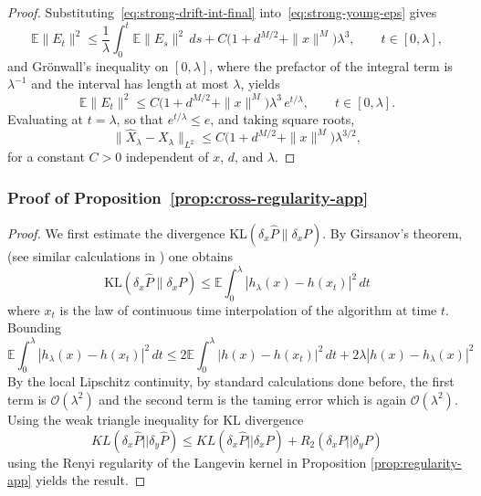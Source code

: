 \documentclass[11pt,a4paper,reqno]{amsart}
\theoremstyle{plain}
\theoremstyle{definition}
\theoremstyle{remark}
\newcommand{\E}{\mathbb{E}}
\newcommand{\KL}{\mathrm{KL}}
\begin{document}
\begin{proof}
Substituting~\eqref{eq:strong-drift-int-final} into~\eqref{eq:strong-young-eps}
gives
\[
  \E\|E_t\|^2
  \le
  \frac{1}{\lambda}\int_0^t \E\|E_s\|^2\,ds
  +
  C\bigl(1+d^{M/2}+\|x\|^{M}\bigr)\lambda^3,
  \qquad t\in[0,\lambda],
\]
and Grönwall's inequality on $[0,\lambda]$, where the prefactor of the integral
term is $\lambda^{-1}$ and the interval has length at most $\lambda$, yields
\[
  \E\|E_t\|^2
  \le
  C\bigl(1+d^{M/2}+\|x\|^{M}\bigr)\lambda^3\,e^{t/\lambda},
  \qquad t\in[0,\lambda].
\]
Evaluating at $t=\lambda$, so that $e^{t/\lambda}\le e$, and taking square roots,
\[
  \|\widehat X_\lambda-X_\lambda\|_{L^2}
  \le
  C\bigl(1+d^{M/2}+\|x\|^{M}\bigr)\lambda^{3/2},
\]
for a constant $C>0$ independent of $x$, $d$, and $\lambda$.
\end{proof}


\subsubsection{Proof of Proposition~\ref{prop:cross-regularity-app}}
\label{proof:cross-regularity}
\begin{proof}
We first estimate the divergence $\KL(\delta_x\widehat{P}\|\delta_x P)$.
By Girsanov's theorem, (see similar calculations in \cite{tula}) one obtains 
\[\KL(\delta_x\widehat{P}\|\delta_x P)\leq \E \int_0^\lambda |h_\lambda(x)-h(x_t)|^2\,dt\] where $x_t$ is the law of continuous time interpolation of the algorithm at time $t.$
Bounding \[\E \int_0^\lambda |h_\lambda(x)-h(x_t)|^2\,dt\leq 2 \E \int_0^\lambda |h(x)-h(x_t)|^2\,dt+ 2 \lambda |h(x)-h_\lambda(x)|^2\]
By the local Lipschitz continuity, by standard calculations done before, the first term is $\mathcal{O}(\lambda^2)$ and the second term is the taming error which is again $\mathcal{O}(\lambda^2).$
Using the weak triangle inequality for KL divergence
\[KL(\delta_x\hat{P}||\delta_y\hat{P})\leq KL(\delta_x \hat{P}|| \delta_x P)+ R_2(\delta_x P||\delta_y P)\] using the Renyi regularity of the Langevin kernel in Proposition \ref{prop:regularity-app} yields the result. 
\end{proof}
\end{document}
